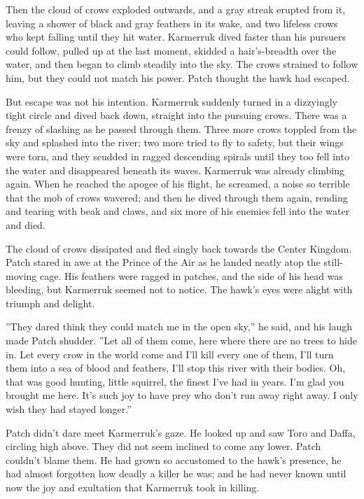 \documentclass[12pt]{book}
\begin{document}
Then the cloud of crows exploded outwards, and a gray streak erupted
from it, leaving a shower of black and gray feathers in its wake, and
two lifeless crows who kept falling until they hit water. Karmerruk
dived faster than his pursuers could follow, pulled up at the last
moment, skidded a hair's-breadth over the water, and then began to
climb steadily into the sky. The crows strained to follow him, but
they could not match his power. Patch thought the hawk had escaped.

But escape was not his intention. Karmerruk suddenly turned in a
dizzyingly tight circle and dived back down, straight into the
pursuing crows. There was a frenzy of slashing as he passed through
them. Three more crows toppled from the sky and splashed into the
river; two more tried to fly to safety, but their wings were torn, and
they scudded in ragged descending spirals until they too fell into the
water and disappeared beneath its waves. Karmerruk was already
climbing again. When he reached the apogee of his flight, he screamed,
a noise so terrible that the mob of crows wavered; and then he dived
through them again, rending and tearing with beak and claws, and six
more of his enemies fell into the water and died.

The cloud of crows dissipated and fled singly back towards the Center
Kingdom. Patch stared in awe at the Prince of the Air as he landed
neatly atop the still-moving cage. His feathers were ragged in
patches, and the side of his head was bleeding, but Karmerruk seemed
not to notice. The hawk's eyes were alight with triumph and delight.

''They dared think they could match me in the open sky,'' he said, and
his laugh made Patch shudder. ''Let all of them come, here where there
are no trees to hide in. Let every crow in the world come and I'll
kill every one of them, I'll turn them into a sea of blood and
feathers, I'll stop this river with their bodies. Oh, that was good
hunting, little squirrel, the finest I've had in years. I'm glad you
brought me here. It's such joy to have prey who don't run away right
away. I only wish they had stayed longer.''

Patch didn't dare meet Karmerruk's gaze. He looked up and saw Toro and
Daffa, circling high above. They did not seem inclined to come any
lower. Patch couldn't blame them. He had grown so accustomed to the
hawk's presence, he had almost forgotten how deadly a killer he was;
and he had never known until now the joy and exultation that Karmerruk
took in killing.
\end{document}
